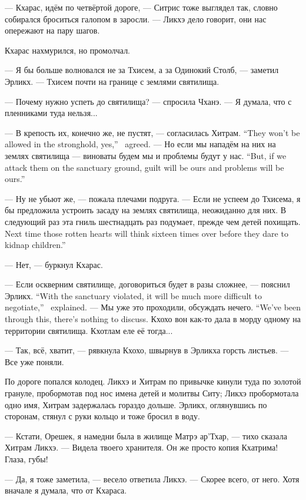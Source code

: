 --- Кхарас, идём по четвёртой дороге, --- Ситрис тоже выглядел так, словно собирался броситься галопом в заросли.
--- Ликхэ дело говорит, они нас опережают на пару шагов.

Кхарас нахмурился, но промолчал.

--- Я бы больше волновался не за Тхисем, а за Одинокий Столб, --- заметил Эрликх.
--- Тхисем почти на границе с землями святилища.

--- Почему нужно успеть до святилища? --- спросила Чханэ.
--- Я думала, что с пленниками туда нельзя...

{--- В крепость их, конечно же, не пустят, --- согласилась Хитрам.}
{``They won't be allowed in the stronghold, yes,'' \Chitram\ agreed.}
{--- Но если мы нападём на них на землях святилища --- виноваты будем мы и проблемы будут у нас.}
{``But, if we attack them on the sanctuary ground, guilt will be ours and problems will be ours.''}

--- Ну не убьют же, --- пожала плечами подруга.
--- Если не успеем до Тхисема, я бы предложила устроить засаду на землях святилища, неожиданно для них.
{В следующий раз эта гниль шестнадцать раз подумает, прежде чем детей похищать.}
{Next time those rotten hearts will think sixteen times over before they dare to kidnap children.''}

--- Нет, --- буркнул Кхарас.

{--- Если оскверним святилище, договориться будет в разы сложнее, --- пояснил Эрликх.}
{``With the sanctuary violated, it will be much more difficult to negotiate,'' \Oerlikch\ explained.}
{--- Мы уже это проходили, обсуждать нечего.}
{``We've been through this, there's nothing to discuss.}
Кхохо вон как-то дала в морду одному на территории святилища.
Кхотлам еле её тогда...

--- Так, всё, хватит, --- рявкнула Кхохо, швырнув в Эрликха горсть листьев.
--- Все уже поняли.

По дороге попался колодец.
Ликхэ и Хитрам по привычке кинули туда по золотой грануле, пробормотав под нос имена детей и молитвы Ситу;
Ликхэ пробормотала одно имя, Хитрам задержалась гораздо дольше.
Эрликх, оглянувшись по сторонам, стянул с руки кольцо и тоже бросил в воду.

--- Кстати, Орешек, я намедни была в жилище Матрэ ар'Тхар, --- тихо сказала Хитрам Ликхэ.
--- Видела твоего хранителя.
Он же просто копия Кхатрима!
Глаза, губы!

--- Да, я тоже заметила, --- весело ответила Ликхэ.
--- Скорее всего, от него.
Хотя вначале я думала, что от Кхараса.

